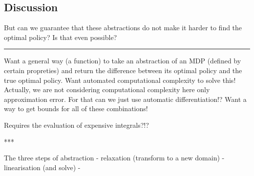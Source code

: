 \hypertarget{discussion}{%
\subsection{Discussion}\label{discussion}}

But can we guarantee that these abstractions do not make it harder to
find the optimal policy? Is that even possible?

\begin{center}\rule{0.5\linewidth}{\linethickness}\end{center}

Want a general way (a function) to take an abstraction of an MDP
(defined by certain propreties) and return the difference between its
optimal policy and the true optimal policy. Want automated computational
complexity to solve this! Actually, we are not considering computational
complexity here only approximation error. For that can we just use
automatic differentiation!? Want a way to get bounds for all of these
combinations!

Requires the evaluation of expensive integrals?!?



***

The three steps of abstraction - relaxation (transform to a new domain)
- linearisation (and solve) -
